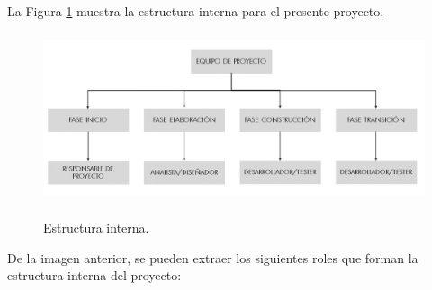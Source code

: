 \documentclass[12pt,a4paper, twoside]{report}
\begin{document}
	La Figura \ref{fig:plannig-organization} muestra la estructura interna para el presente proyecto.

	\begin{figure}[!ht]   
		\caption{Estructura interna.} 
		\begin{center} 
	 		\includegraphics[width=13cm,height=5cm]{Images/planning/intern_organization} \\
			\label{fig:plannig-organization} 
		\end{center}  
	\end{figure}  

	De la imagen anterior, se pueden extraer los siguientes roles que forman la estructura interna del proyecto:
\end{document}

